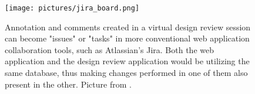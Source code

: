 \begin{figure}%
	\texttt{[image: pictures/jira\_board.png]}
	\caption[Annotation available in web applications.]
			{Annotation and comments created in a virtual design review session can become "issues" or "tasks" in more conventional web application collaboration tools, such as 
			Atlassian's Jira. Both the web application and the design review application would be utilizing the same database, thus making changes performed in one of them also
			present in the other. Picture from \citet{Atlassian}.}
	\label{fig:jira_board}
\end{figure} 